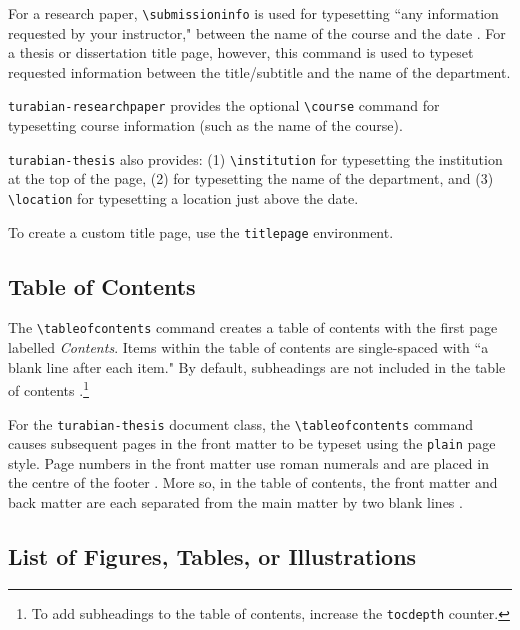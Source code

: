 \documentclass{article}
\newcommand{\textcmd}[1]{\texttt{\textbackslash #1}}
\begin{document}
For a research paper, \textcmd{submissioninfo} is used for typesetting ``any information requested by your instructor," between the name of the course and the date \autocite[376]{turabian_manual_2013}. For a thesis or dissertation title page, however, this command is used to typeset requested information between the title/subtitle and the name of the department.

\texttt{turabian-researchpaper} provides the optional \textcmd{course} command for typesetting course information (such as the name of the course).

\texttt{turabian-thesis} also provides: (1) \textcmd{institution} for typesetting the institution at the top of the page, (2) for typesetting the name of the department, and (3) \textcmd{location} for typesetting a location just above the date.

To create a custom title page, use the \texttt{titlepage} environment.


\subsection{Table of Contents}
\label{subsec:toc}

\marginnote{\textcmd{tableofcontents}}
The \textcmd{tableofcontents} command creates a table of contents with the first page labelled \emph{Contents}. Items within the table of contents are single-spaced with ``a blank line after each item." By default, subheadings are not included in the table of contents \autocite[380]{turabian_manual_2013}.\footnote{%
	To add subheadings to the table of contents, increase the \texttt{tocdepth} counter.}
	
For the \texttt{turabian-thesis} document class, the \textcmd{tableofcontents} command causes subsequent pages in the front matter to be typeset using the \texttt{plain} page style. Page numbers in the front matter use roman numerals and are placed in the centre of the footer \autocite[373--374; refer to subsection~\ref{subsec:page_styles}]{turabian_manual_2013}. More so, in the table of contents, the front matter and back matter are each separated from the main matter by two blank lines \autocite[380]{turabian_manual_2013}.


\subsection{List of Figures, Tables, or Illustrations}
\label{subsec:toft}
\end{document}
